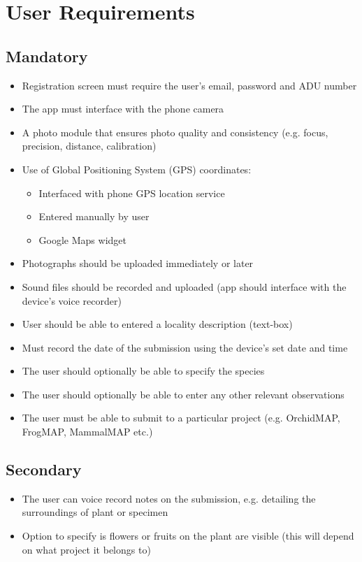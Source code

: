 \documentclass[12pt,a4paper,oneside]{article}
\begin{document}
\section{User Requirements}
\subsection{Mandatory}
  \begin{spacing}{1.4}
    \begin{itemize}
      \item Registration screen must require the user's email, password and ADU number
      \item The app must interface with the phone camera
      \item A photo module that ensures photo quality and consistency (e.g. focus, precision, distance, calibration)
      \item Use of Global Positioning System (GPS) coordinates:
        \begin{itemize}
          \item Interfaced with phone GPS location service
          \item Entered manually by user
          \item Google Maps widget
        \end{itemize}
      \item Photographs should be uploaded immediately or later
      \item Sound files should be recorded and uploaded (app should interface with the device's voice recorder)
      \item User should be able to entered a locality description (text-box)
      \item Must record the date of the submission using the device's set date and time
      \item The user should optionally be able to specify the species
      \item The user should optionally be able to enter any other relevant observations
      \item The user must be able to submit to a particular project (e.g. OrchidMAP, FrogMAP, MammalMAP etc.)
    \end{itemize}
  \end{spacing}
\subsection{Secondary}
  \begin{spacing}{1.4}
    \begin{itemize}
      \item The user can voice record notes on the submission, e.g. detailing the surroundings of plant or specimen
      \item Option to specify is flowers or fruits on the plant are visible (this will depend on what project it belongs to)
    \end{itemize}
  \end{spacing}
\end{document}
